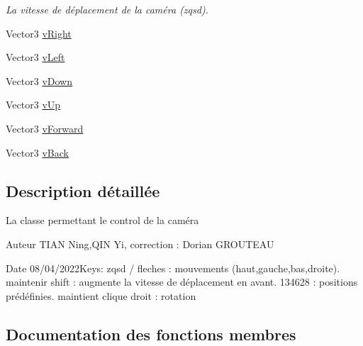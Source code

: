 \begin{DoxyCompactItemize}
\begin{DoxyCompactList}\small\item\em La vitesse de déplacement de la caméra (zqsd). \end{DoxyCompactList}\item 
Vector3 \mbox{\hyperlink{class_camera_control_a63413261e7373457a03491dacfede5d0}{v\+Right}}
\item 
Vector3 \mbox{\hyperlink{class_camera_control_a7e71f599bbb8a0bf0bb072980445ea07}{v\+Left}}
\item 
Vector3 \mbox{\hyperlink{class_camera_control_a8bf52cc7231378a27f7f5f0805ee0145}{v\+Down}}
\item 
Vector3 \mbox{\hyperlink{class_camera_control_a7c3cf2f772a682994001bec237f91d49}{v\+Up}}
\item 
Vector3 \mbox{\hyperlink{class_camera_control_a92b1ad2e8e5572f2f4058a4124583a40}{v\+Forward}}
\item 
Vector3 \mbox{\hyperlink{class_camera_control_ada86d34c3703c6f9aec6552343aec7c0}{v\+Back}}
\end{DoxyCompactItemize}


\subsection{Description détaillée}
La classe permettant le control de la caméra 

\begin{DoxyAuthor}{Auteur}
T\+I\+AN Ning,Q\+IN Yi, correction \+: Dorian G\+R\+O\+U\+T\+E\+AU 
\end{DoxyAuthor}
\begin{DoxyDate}{Date}
08/04/2022\+Keys\+: zqsd / fleches \+: mouvements (haut,gauche,bas,droite). maintenir shift \+: augmente la vitesse de déplacement en avant. 134628 \+: positions prédéfinies. maintient clique droit \+: rotation ~\newline

\end{DoxyDate}


\subsection{Documentation des fonctions membres}
\mbox{\label{class_camera_control_a879e70766aaa6eec8be532ab6712dd6b}} 
